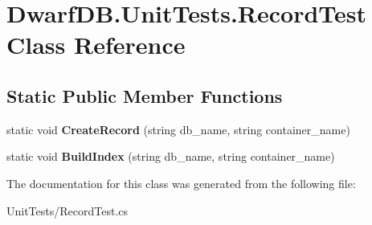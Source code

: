 \hypertarget{class_dwarf_d_b_1_1_unit_tests_1_1_record_test}{
\section{DwarfDB.UnitTests.RecordTest Class Reference}
\label{class_dwarf_d_b_1_1_unit_tests_1_1_record_test}
}
\subsection*{Static Public Member Functions}
\begin{DoxyCompactItemize}
\item 
\hypertarget{class_dwarf_d_b_1_1_unit_tests_1_1_record_test_a907b0948a207c3deb0d62b1df26bf1f6}{
static void {\bfseries CreateRecord} (string db\_\-name, string container\_\-name)}
\label{class_dwarf_d_b_1_1_unit_tests_1_1_record_test_a907b0948a207c3deb0d62b1df26bf1f6}

\item 
\hypertarget{class_dwarf_d_b_1_1_unit_tests_1_1_record_test_af544fca880eb0a0bf19e6e0728c92c64}{
static void {\bfseries BuildIndex} (string db\_\-name, string container\_\-name)}
\label{class_dwarf_d_b_1_1_unit_tests_1_1_record_test_af544fca880eb0a0bf19e6e0728c92c64}

\end{DoxyCompactItemize}


The documentation for this class was generated from the following file:\begin{DoxyCompactItemize}
\item 
UnitTests/RecordTest.cs\end{DoxyCompactItemize}
